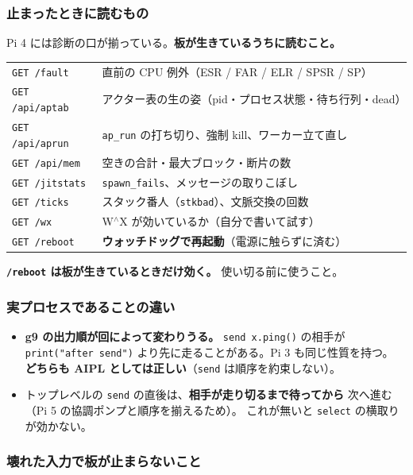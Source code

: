 \documentclass[11pt,a4paper]{ltjsarticle}
\begin{document}
\subsubsection*{止まったときに読むもの}

Pi 4 には診断の口が揃っている。\textbf{板が生きているうちに読むこと。}

\begin{center}
\small
\begin{tabular}{@{}ll@{}}
\toprule
\texttt{GET /fault} & 直前の CPU 例外（ESR / FAR / ELR / SPSR / SP） \\
\texttt{GET /api/aptab} & アクター表の生の姿（pid・プロセス状態・待ち行列・dead） \\
\texttt{GET /api/aprun} & \texttt{ap\_run} の打ち切り、強制 kill、ワーカー立て直し \\
\texttt{GET /api/mem} & 空きの合計・最大ブロック・断片の数 \\
\texttt{GET /jitstats} & \texttt{spawn\_fails}、メッセージの取りこぼし \\
\texttt{GET /ticks} & スタック番人（\texttt{stkbad}）、文脈交換の回数 \\
\texttt{GET /wx} & W$^\wedge$X が効いているか（自分で書いて試す） \\
\texttt{GET /reboot} & \textbf{ウォッチドッグで再起動}（電源に触らずに済む） \\
\bottomrule
\end{tabular}
\end{center}

\textbf{\texttt{/reboot} は板が生きているときだけ効く。} 使い切る前に使うこと。

\subsubsection*{実プロセスであることの違い}

\begin{itemize}
\item \textbf{g9 の出力順が回によって変わりうる。} \texttt{send x.ping()} の相手が
  \texttt{print("after send")} より先に走ることがある。Pi 3 も同じ性質を持つ。
  \textbf{どちらも AIPL としては正しい}（\texttt{send} は順序を約束しない）。
\item トップレベルの \texttt{send} の直後は、\textbf{相手が走り切るまで待ってから}
  次へ進む（Pi 5 の協調ポンプと順序を揃えるため）。
  これが無いと \texttt{select} の横取りが効かない。
\end{itemize}

\subsubsection*{壊れた入力で板が止まらないこと}
\end{document}
